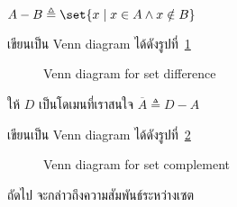 \begin{definition}
$A-B\triangleq\set{x\mid x\in A\wedge x\notin B}$
\end{definition}
เขียนเป็น Venn diagram ได้ดังรูปที่~\ref{fig:difference}
%
\begin{figure}
\centering
{}
\caption{Venn diagram for set difference}
\label{fig:difference}
\end{figure}

\begin{definition}
ให้ $D$ เป็นโดเมนที่เราสนใจ \enskip $\overline{A}\triangleq D-A$
\end{definition}
เขียนเป็น Venn diagram ได้ดังรูปที่~\ref{fig:complement}
%
\begin{figure}
\centering
{}
\caption{Venn diagram for set complement}
\label{fig:complement}
\end{figure}

ถัดไป จะกล่าวถึงความสัมพันธ์ระหว่างเซต

